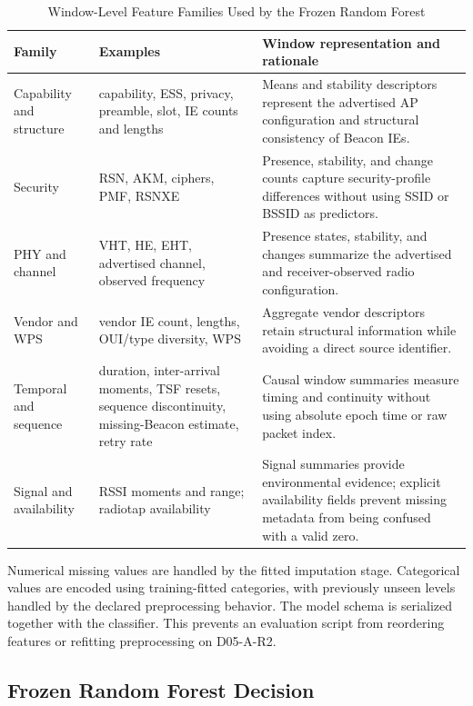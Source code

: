\documentclass[conference]{IEEEtran}
\begin{document}
\begin{table}[t]
\caption{Window-Level Feature Families Used by the Frozen Random Forest}
\label{tab:features}
\centering
\footnotesize
\begin{tabularx}{\textwidth}{@{}p{25mm}p{28mm}Y@{}}
\toprule
\textbf{Family} & \textbf{Examples} & \textbf{Window representation and rationale}\\
\midrule
Capability and structure & capability, ESS, privacy, preamble, slot, IE counts and lengths & Means and stability descriptors represent the advertised AP configuration and structural consistency of Beacon IEs.\\
Security & RSN, AKM, ciphers, PMF, RSNXE & Presence, stability, and change counts capture security-profile differences without using SSID or BSSID as predictors.\\
PHY and channel & VHT, HE, EHT, advertised channel, observed frequency & Presence states, stability, and changes summarize the advertised and receiver-observed radio configuration.\\
Vendor and WPS & vendor IE count, lengths, OUI/type diversity, WPS & Aggregate vendor descriptors retain structural information while avoiding a direct source identifier.\\
Temporal and sequence & duration, inter-arrival moments, TSF resets, sequence discontinuity, missing-Beacon estimate, retry rate & Causal window summaries measure timing and continuity without using absolute epoch time or raw packet index.\\
Signal and availability & RSSI moments and range; radiotap availability & Signal summaries provide environmental evidence; explicit availability fields prevent missing metadata from being confused with a valid zero.\\
\bottomrule
\end{tabularx}
\end{table}

Numerical missing values are handled by the fitted imputation stage. Categorical values are encoded using training-fitted categories, with previously unseen levels handled by the declared preprocessing behavior. The model schema is serialized together with the classifier. This prevents an evaluation script from reordering features or refitting preprocessing on D05-A-R2.

\subsection{Frozen Random Forest Decision}
\end{document}
